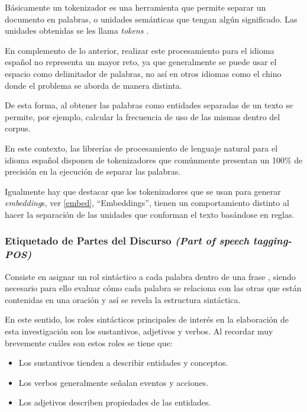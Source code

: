 \documentclass[
  12pt,
  openany]{book}
\begin{document}
Básicamente un tokenizador es una herramienta que permite separar un documento en palabras, o unidades semánticas que tengan algún significado. Las unidades obtenidas se les llama \emph{tokens} \citep{straka2017}.

En complemento de lo anterior, realizar este procesamiento para el idioma español no representa un mayor reto, ya que generalmente se puede usar el espacio como delimitador de palabras, no así en otros idiomas como el chino donde el problema se aborda de manera distinta.

De esta forma, al obtener las palabras como entidades separadas de un texto se permite, por ejemplo, calcular la frecuencia de uso de las mismas dentro del corpus.

En este contexto, las librerías de procesamiento de lenguaje natural para el idioma español disponen de tokenizadores que comúnmente presentan un 100\% de precisión en la ejecución de separar las palabras.

Igualmente hay que destacar que los tokenizadores que se usan para generar \emph{embedding}s, ver \ref{embed}, ``Embeddings'', tienen un comportamiento distinto al hacer la separación de las unidades que conforman el texto basándose en reglas.

\hypertarget{pos}{%
\subsubsection{\texorpdfstring{Etiquetado de Partes del Discurso \emph{(Part of speech tagging-POS)}}{Etiquetado de Partes del Discurso (Part of speech tagging-POS)}}\label{pos}}

Consiste en asignar un rol sintáctico a cada palabra dentro de una frase \citep{eisenstein2019}, siendo necesario para ello evaluar cómo cada palabra se relaciona con las otras que están contenidas en una oración y así se revela la estructura sintáctica.

En este sentido, los roles sintácticos principales de interés en la elaboración de esta investigación son los sustantivos, adjetivos y verbos. Al recordar muy brevemente cuáles son estos roles se tiene que:

\begin{itemize}
\item
  Los sustantivos tienden a describir entidades y conceptos.
\item
  Los verbos generalmente señalan eventos y acciones.
\item
  Los adjetivos describen propiedades de las entidades.
\end{itemize}
\end{document}
